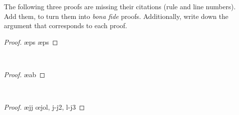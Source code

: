 \problempart
The following three proofs are missing their citations (rule and line numbers). Add them, to turn them into \textit{bona fide} proofs. Additionally, write down the argument that corresponds to each proof.
\newpage
\begin{multicols}{2}
\begin{proof}
\ae{ps}
\ae{ps}
\end{proof}
\\

\bigskip

\begin{proof}
\open
	\ae{ab}
\close
{}
\end{proof}
\\

\columnbreak

\begin{proof}
\open
	\ae{jj}
\close
\open
\close
{}\oe{jol, j-j2, l-j3}
\end{proof}
\\
\end{multicols}

